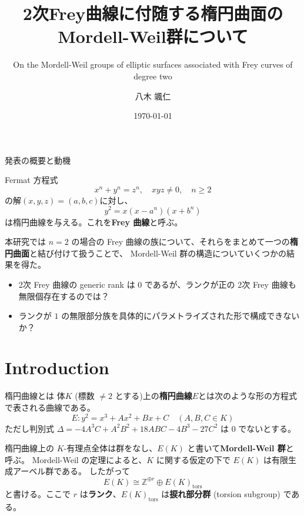 \documentclass{classes/mybeamer}
\title{2次Frey曲線に付随する楕円曲面のMordell-Weil群について}
\subtitle{On the Mordell-Weil groups of elliptic surfaces associated with Frey curves of degree two}
\author{八木 颯仁}
\institute{慶應義塾大学 栗原研究室 修士2年}
\date{\today}
\begin{document}
\begin{frame}
    \titlepage
\end{frame}

\begin{frame}{発表の概要と動機}
    \begin{dfn*}
        Fermat 方程式
        \begin{equation}
            x^n + y^n = z^n, \quad xyz \neq 0, \quad n \geq 2
        \end{equation}
        の解$(x, y, z)=(a,b,c)$に対し、
        \begin{equation}
            y^2 = x (x-a^n) (x+b^n)
        \end{equation}
        は楕円曲線を与える。これを\color{blue}\textbf{Frey 曲線}\color{black}と呼ぶ。
    \end{dfn*}
    本研究では $n=2$ の場合の Frey 曲線の族について、それらをまとめて一つの\textbf{楕円曲面}と結び付けて扱うことで、 Mordell-Weil 群の構造についていくつかの結果を得た。
    \begin{itemize}
        \item 2次 Frey 曲線の generic rank は $0$ であるが、ランクが正の 2次 Frey 曲線も無限個存在するのでは？
        \item ランクが $1$ の無限部分族を具体的にパラメトライズされた形で構成できないか？
    \end{itemize}
    \vspace{1em}
    \tableofcontents
\end{frame}

\section{Introduction}
\begin{frame}{楕円曲線とは}
    体$K$ (標数 $\neq2$ とする)上の\color{blue}\textbf{楕円曲線}\color{black}$E$とは次のような形の方程式で表される曲線である。
    \begin{equation*}
        E: y^{2} = x^{3} + Ax^2 + Bx + C \quad (A,B,C \in K)
    \end{equation*}
    ただし判別式 $\Delta = -4A^3C + A^2B^2 + 18ABC - 4B^3 - 27C^2$ は $0$ でないとする。

    \vspace{1cm}

    楕円曲線上の $K$-有理点全体は群をなし、$E(K)$ と書いて\color{blue}\textbf{Mordell-Weil 群}\color{black}と呼ぶ。
    Mordell-Weil の定理によると、$K$ に関する仮定の下で $E(K)$ は有限生成アーベル群である。
    したがって
    \begin{equation*}
        E(K) \cong \mathbb{Z}^{\oplus r} \oplus E(K)_{\mathrm{tors}}
    \end{equation*}
    と書ける。ここで $r$ は\color{blue}\textbf{ランク}\color{black}、$E(K)_{\mathrm{tors}}$ は\color{blue}\textbf{捩れ部分群}\color{black} (torsion subgroup) である。
\end{frame}
\end{document}
